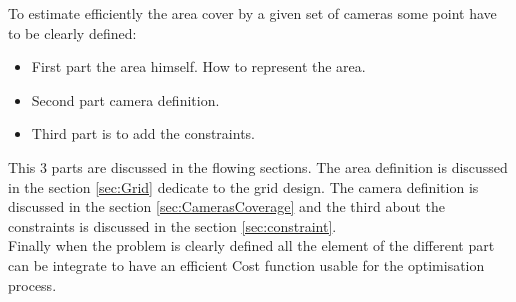 


To estimate efficiently the area cover by a given set of cameras some point have to be clearly defined: 
\begin{itemize}
\item First part the area himself. How to represent the area. 
\item Second part camera definition. 
\item Third part is to add the constraints. \\
\end{itemize} 
 This 3 parts are discussed in the flowing sections. The area definition is discussed in the section \ref{sec:Grid} dedicate to the grid design. The camera definition is discussed in the section \ref{sec:CamerasCoverage} and the third about the constraints is discussed in the section \ref{sec:constraint}.\\
Finally when the problem is clearly defined all the element of the different part can be integrate to have an efficient Cost function usable for the optimisation process.

   
%
%
% 

